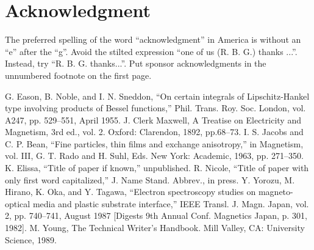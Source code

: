 \documentclass[a4paper,conference]{IEEEtran}
\begin{document}
\section*{Acknowledgment}
The preferred spelling of the word “acknowledgment” in America is without an “e” after the “g”. Avoid the stilted expression “one of us (R. B. G.) thanks ...”. Instead, try “R. B. G. thanks...”. Put sponsor acknowledgments in the unnumbered footnote on the first page.

\begin{thebibliography}{00}
     G. Eason, B. Noble, and I. N. Sneddon, “On certain integrals of Lipschitz-Hankel type involving products of Bessel functions,” Phil. Trans. Roy. Soc. London, vol. A247, pp. 529–551, April 1955.
     J. Clerk Maxwell, A Treatise on Electricity and Magnetism, 3rd ed., vol. 2. Oxford: Clarendon, 1892, pp.68–73.
     I. S. Jacobs and C. P. Bean, “Fine particles, thin films and exchange anisotropy,” in Magnetism, vol. III, G. T. Rado and H. Suhl, Eds. New York: Academic, 1963, pp. 271–350.
     K. Elissa, “Title of paper if known,” unpublished.
     R. Nicole, “Title of paper with only first word capitalized,” J. Name Stand. Abbrev., in press.
     Y. Yorozu, M. Hirano, K. Oka, and Y. Tagawa, “Electron spectroscopy studies on magneto-optical media and plastic substrate interface,” IEEE Transl. J. Magn. Japan, vol. 2, pp. 740–741, August 1987 [Digests 9th Annual Conf. Magnetics Japan, p. 301, 1982].
     M. Young, The Technical Writer’s Handbook. Mill Valley, CA: University Science, 1989.
\end{thebibliography}
\end{document}
